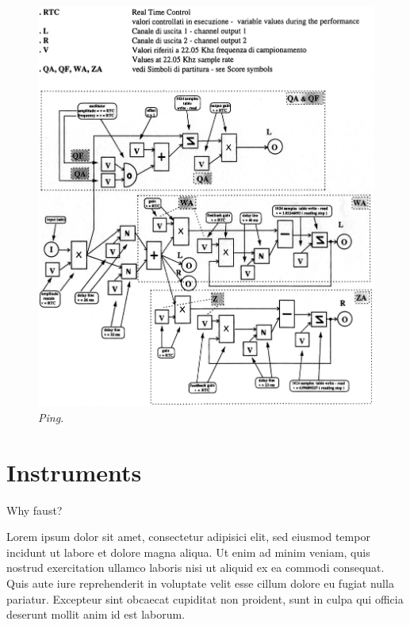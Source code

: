 \documentclass[twoside,a4paper]{article}
\begin{document}
\begin{figure}[ht]
\centerline{\includegraphics[scale=0.5]{img/1991-lm-mobilelocale-diagram2.png}}
\caption{\label{fft_plot}{\it Ping.}}
\end{figure}

\section{Instruments}
\label{sec:instruments}

Why faust?

Lorem ipsum dolor sit amet, consectetur adipisici elit, sed eiusmod tempor
incidunt ut labore et dolore magna aliqua. Ut enim ad minim veniam, quis
nostrud exercitation ullamco laboris nisi ut aliquid ex ea commodi consequat.
Quis aute iure reprehenderit in voluptate velit esse cillum dolore eu fugiat
nulla pariatur. Excepteur sint obcaecat cupiditat non proident, sunt in culpa
qui officia deserunt mollit anim id est laborum.

%
\end{document}
